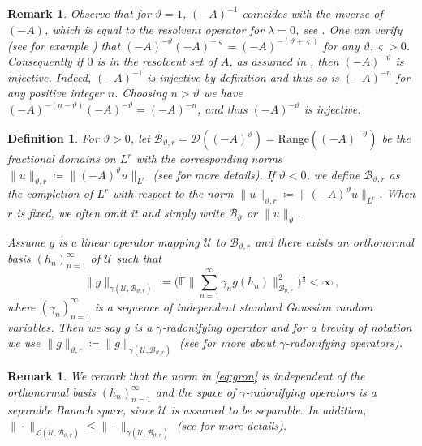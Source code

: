 \documentclass[final]{amsart}
\newtheorem{deff}[thm]{Definition}
\newtheorem{rem}[thm]{Remark}
\numberwithin{thm}{section}
\numberwithin{equation}{section}
\newcommand{\E}{\mathbb{E}}
\newcommand{\U}{\mathcal{U}}
\newcommand{\Dm}{\mathcal{D}}
\newcommand{\B}{\mathcal{B}}
\begin{document}
\begin{rem}\label{rem:neg-powers-r-inj}
    Observe that for $\vartheta = 1$, $(-A)^{-1}$ coincides with the inverse of $(-A)$, which is equal to the resolvent operator for $\lambda = 0$, see \cite[Lemma 2.1.6]{lunardi}. 
One can verify (see for example \cite[Theorem 3.1.3]{lunardi}) that 
$(-A)^{-\vartheta}(-A)^{-\varsigma} = (-A)^{-(\vartheta + \varsigma)}$
for any $\vartheta, \varsigma > 0$. Consequently 
if $0$ is in the resolvent set of $A$, as assumed in , then
$(-A)^{-\vartheta}$ is injective. Indeed, $(-A)^{-1}$ is injective by definition and thus so is $(-A)^{-n}$ for any positive integer $n$. Choosing $n > \vartheta$ we have $(-A)^{-(n - \vartheta)}(-A)^{-\vartheta} = (-A)^{-n}$, and thus $(-A)^{-\vartheta}$ is injective.
\end{rem}


\begin{deff}\label{fractional-domains-deff}
    For $\vartheta > 0$, let $\B_{\vartheta,r} = \Dm((-A)^\vartheta) = \textrm{Range}((-A)^{-\vartheta})$ 
    be the fractional domains 
    on $L^r$ with the corresponding norms $\|u\|_{\vartheta,r} \coloneqq \|(-A)^\vartheta u\|_{L^r}$ (see \cite[Section 5.4]{hairer-notes} for more details). If $\vartheta < 0$, we define $\B_{\vartheta,r}$ as the completion of $L^r$ with respect to the norm $\|u\|_{\vartheta,r} \coloneqq \|(-A)^\vartheta u\|_{L^r}$. 
    When $r$ is fixed, we often omit it and simply write $\B_\vartheta$ or $\|u\|_\vartheta$. 
    
    Assume $g$ is a linear operator mapping $\U$ to $\B_{\vartheta,r}$
and there exists an orthonormal basis $(h_n)_{n = 1}^\infty$ of $\U$ such that 
\begin{equation}\label{eq:gron}
    \|g\|_{\gamma(\U,\B_{\vartheta,r})} := \Big(\E \Big\| \sum_{n =1}^\infty \gamma_n g(h_n) \Big\|_{\B_{\vartheta,r}}^2\Big)^{\frac{1}{2}} < \infty \,,
\end{equation}
where $(\gamma_n)_{n = 1}^\infty$ is a sequence of independent standard Gaussian random variables. Then we say $g$ is a $\gamma$-radonifying operator and for a brevity of notation we use $\|g\|_{\vartheta,r} \coloneqq \|g\|_{\gamma(\U,\B_{\vartheta,r})}$
 (see \cite{radonifying-survey, umd-existence, umd-integration} for more about $\gamma$-radonifying operators). 
\end{deff}

\begin{rem}\label{rmk:gropp}
    We remark that the norm in \eqref{eq:gron} is independent of the orthonormal basis $(h_n)_{n = 1}^\infty$ and the space of $\gamma$-radonifying operators is a separable Banach space, since $\U$ is assumed to be separable. In addition, 
    $\|\cdot\|_{\mathcal{L}(\U, \B_{\vartheta,r})} \leq \|\cdot\|_{\gamma(\U, \B_{\vartheta,r})}$ (see \cite{radonifying-survey} for more details). 
\end{rem}
\end{document}
